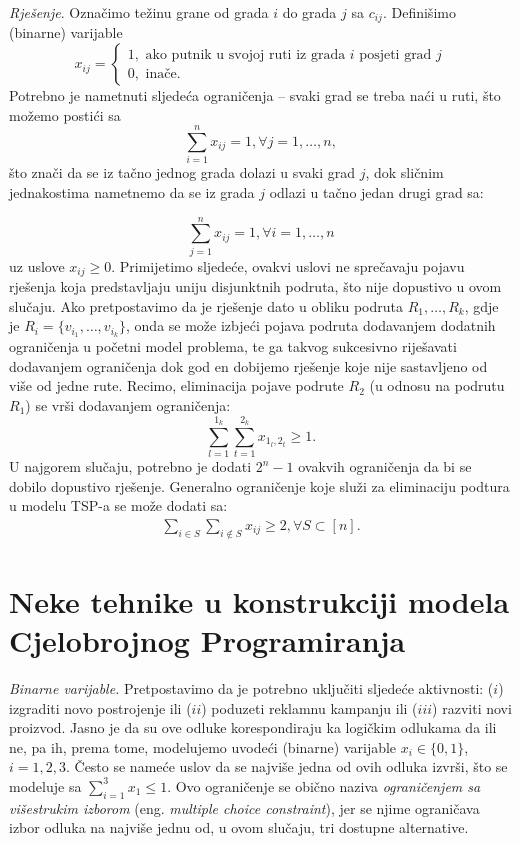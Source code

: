 \documentclass[a4paper, utf8, 11pt, colorlinks]{book}
\begin{document}
\emph{Rješenje}. Označimo težinu grane od grada $i$ do grada $j$ sa $c_{ij}$.  Definišimo (binarne) varijable 
$$x_{ij} = \begin{cases}
                1, \mbox{ ako putnik u svojoj ruti iz grada } i \mbox{ posjeti grad } j \\
                0, \mbox{ inače}. 
          \end{cases}$$ 
Potrebno je nametnuti sljedeća ograničenja -- svaki grad se treba naći u ruti,  što možemo postići sa 
$$  \sum_{i=1}^n x_{ij} = 1, \forall j =1,\ldots, n,$$ 
što znači da se iz tačno jednog grada dolazi u svaki grad $j$, dok sličnim jednakostima nametnemo da se iz grada $j$ odlazi u tačno jedan drugi grad sa:

$$  \sum_{j=1}^n x_{ij} = 1, \forall i =1,\ldots, n$$ 
 uz uslove $x_{ij}\geq 0$. Primijetimo sljedeće, ovakvi uslovi ne sprečavaju pojavu rješenja koja predstavljaju uniju disjunktnih podruta, što nije dopustivo u ovom slučaju. Ako pretpostavimo da je rješenje dato u obliku podruta $R_1, \ldots, R_k$, gdje je $R_i = \{ v_{i_1}, \ldots, v_{i_k} \}$, onda se može izbjeći pojava podruta dodavanjem dodatnih ograničenja u početni model problema, te ga takvog sukcesivno riješavati dodavanjem ograničenja dok god en dobijemo rješenje koje nije sastavljeno od više od jedne rute. Recimo, eliminacija pojave podrute $R_2$ (u odnosu na podrutu $R_1$) se vrši dodavanjem ograničenja:
 $$ \sum_{l=1}^{1_k}\sum_{t=1}^{2_k} x_{1_l, 2_t} \geq 1.$$
 U najgorem slučaju, potrebno je dodati $2^n-1$ ovakvih ograničenja da bi se dobilo dopustivo rješenje. 
 Generalno ograničenje koje služi za eliminaciju podtura u modelu TSP-a se može dodati sa:
 \begin{align}
 	  \sum_{i \in S} \sum_{i \notin S} x_{ij} \geq 2, \forall S \subset [n].
 \end{align}
 
 \section{Neke tehnike u konstrukciji modela Cjelobrojnog Programiranja}
 
 \emph{Binarne varijable.} Pretpostavimo da je potrebno uključiti sljedeće aktivnosti: ($i$) izgraditi novo postrojenje ili
($ii$) poduzeti reklamnu kampanju ili ($iii$) razviti novi proizvod. Jasno je da su ove odluke korespondiraju ka logičkim odlukama da ili ne, pa ih, prema tome, modelujemo   uvodeći  (binarne) varijable $x_i \in \{0, 1 \}$, $i=1,2,3$. Često se nameće uslov da se najviše jedna od ovih odluka izvrši, što se modeluje sa $\sum_{i=1}^3 x_1 \leq 1$. Ovo ograničenje se obično naziva \emph{ograničenjem sa višestrukim izborom} (eng. \emph{multiple choice constraint}), jer se njime ograničava izbor odluka na najviše jednu od, u ovom slučaju, tri dostupne alternative. 
\end{document}
